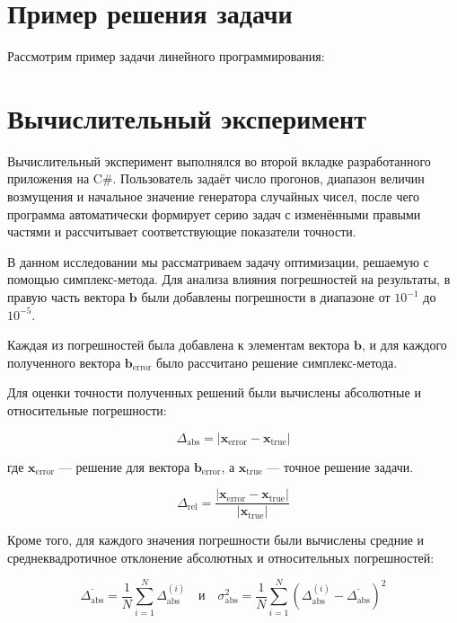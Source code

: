 \section{Пример решения задачи}

Рассмотрим пример задачи линейного программирования:



\newpage

\newpage

\section{Вычислительный эксперимент}

Вычислительный эксперимент выполнялся во второй вкладке разработанного приложения на C\#. Пользователь задаёт число прогонов, диапазон величин возмущения и начальное значение генератора случайных чисел, после чего программа автоматически формирует серию задач с изменёнными правыми частями и рассчитывает соответствующие показатели точности.

В данном исследовании мы рассматриваем задачу оптимизации, решаемую с помощью симплекс-метода. Для анализа влияния погрешностей на результаты, в правую часть вектора $ \mathbf{b} $ были добавлены погрешности в диапазоне от $ 10^{-1} $ до $ 10^{-5} $.

Каждая из погрешностей была добавлена к элементам вектора $ \mathbf{b} $, и для каждого полученного вектора $ \mathbf{b}_{\text{error}} $ было рассчитано решение симплекс-метода.

Для оценки точности полученных решений были вычислены абсолютные и относительные погрешности:

\[
\Delta_{\text{abs}} = | \mathbf{x}_{\text{error}} - \mathbf{x}_{\text{true}} |
\]

где $ \mathbf{x}_{\text{error}} $ — решение для вектора $ \mathbf{b}_{\text{error}} $, а $ \mathbf{x}_{\text{true}} $ — точное решение задачи.

\[
\Delta_{\text{rel}} = \frac{| \mathbf{x}_{\text{error}} - \mathbf{x}_{\text{true}} |}{| \mathbf{x}_{\text{true}} |}
\]

Кроме того, для каждого значения погрешности были вычислены средние и среднеквадротичное отклонение абсолютных и относительных погрешностей:

\[
\overline{\Delta_{\text{abs}}} = \frac{1}{N} \sum_{i=1}^{N} \Delta_{\text{abs}}^{(i)}
\quad \text{и} \quad
\sigma_{\text{abs}}^2 = \frac{1}{N} \sum_{i=1}^{N} (\Delta_{\text{abs}}^{(i)} - \overline{\Delta_{\text{abs}}})^2
\]

